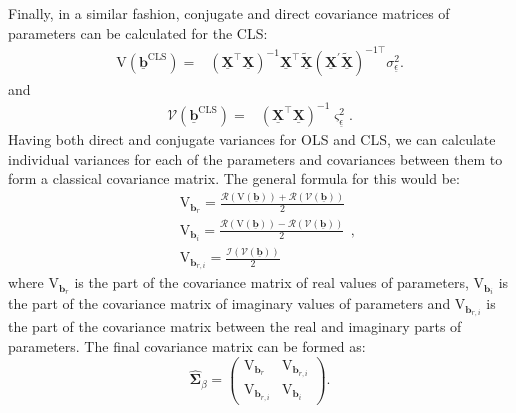 \documentclass[
]{book}
\begin{document}
Finally, in a similar fashion, conjugate and direct covariance matrices of parameters can be calculated for the CLS:
\begin{equation}
    \begin{aligned}
        \mathrm{V}\left( \underline{\boldsymbol{b}}^{\text{CLS}} \right) =
        & \left( \underline{\mathbf{X}}^\top \underline{\mathbf{X}} \right)^{-1} \underline{\mathbf{X}}^\top \tilde{\underline{\mathbf{X}}} \left( {\underline{\mathbf{X}}}^\prime \tilde{\underline{\mathbf{X}}} \right)^{-1 \top}  \sigma_{\underline{\epsilon}}^2 .
    \end{aligned}
    \label{eq:MCLRCLSConjVar}
\end{equation}
and
\begin{equation}
    \begin{aligned}
        \mathcal{V}\left( \underline{\boldsymbol{b}}^{\text{CLS}} \right) =
        & \left( \underline{\mathbf{X}}^\top \underline{\mathbf{X}} \right)^{-1} \varsigma_{\underline{\epsilon}}^2 .
    \end{aligned}
    \label{eq:MCLRCLSDirVar}
\end{equation}
Having both direct and conjugate variances for OLS and CLS, we can calculate individual variances for each of the parameters and covariances between them to form a classical covariance matrix. The general formula for this would be:
\begin{equation*}
    \begin{aligned}
        & \mathrm{V}_{\boldsymbol{b}_r} = \frac{\mathcal{R}\left(\mathrm{V}\left( \underline{\boldsymbol{b}} \right) \right)+\mathcal{R}\left(\mathcal{V}\left( \underline{\boldsymbol{b}} \right) \right)}{2} \\
        & \mathrm{V}_{\boldsymbol{b}_i} = \frac{\mathcal{R}\left(\mathrm{V}\left( \underline{\boldsymbol{b}} \right) \right)-\mathcal{R}\left(\mathcal{V}\left( \underline{\boldsymbol{b}} \right) \right)}{2} \\
        & \mathrm{V}_{\boldsymbol{b}_{r,i}} = \frac{\mathcal{I}\left(\mathcal{V}\left( \underline{\boldsymbol{b}} \right)\right)}{2}
    \end{aligned},
\end{equation*}
where \(\mathrm{V}_{\boldsymbol{b}_r}\) is the part of the covariance matrix of real values of parameters, \(\mathrm{V}_{\boldsymbol{b}_i}\) is the part of the covariance matrix of imaginary values of parameters and \(\mathrm{V}_{\boldsymbol{b}_{r,i}}\) is the part of the covariance matrix between the real and imaginary parts of parameters. The final covariance matrix can be formed as:
\begin{equation}
    \hat{{\boldsymbol{\Sigma}}}_\beta =
    \begin{pmatrix}
        \mathrm{V}_{\boldsymbol{b}_r} & \mathrm{V}_{\boldsymbol{b}_{r,i}} \\
        \mathrm{V}_{\boldsymbol{b}_{r,i}} & \mathrm{V}_{\boldsymbol{b}_i}
    \end{pmatrix}.
    \label{eq:MCLRCLSVariance}
\end{equation}
\end{document}
